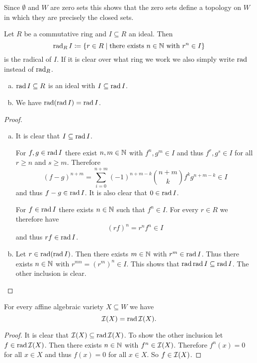 \begin{rem}
 Since $\emptyset$ and $W$ are zero sets this shows that the zero sets define a topology on $W$ in which they are precisely the closed sets.
\end{rem}


\begin{defi}
 Let $R$ be a commutative ring and $I \subseteq R$ an ideal. Then
 \[
  \operatorname{rad}_R I \coloneqq \{r \in R \mid \text{there exists } n \in \mathbb{N} \text{ with } r^n \in I\}
 \]
 is the radical of $I$. If it is clear over what ring we work we also simply write $\operatorname{rad}$ instead of $\operatorname{rad}_R$.
\end{defi}


\begin{lem}
 \begin{enumerate}[a)]
  Let $R$ be a commutative ring and $I \subseteq R$ an ideal. 
  \item
  $\operatorname{rad} I  \subseteq R$ is an ideal with $I \subseteq \operatorname{rad} I$.
  \item
  We have $\operatorname{rad}(\operatorname{rad} I) = \operatorname{rad} I$.
 \end{enumerate}
\end{lem}
\begin{proof}
 \begin{enumerate}[a)]
  \item
  It is clear that $I \subseteq \operatorname{rad} I$.
  
  For $f,g \in \operatorname{rad} I$ there exist $n,m \in \mathbb{N}$ with $f^n, g^m \in I$ and thus $f^r, g^s \in I$ for all $r \geq n$ and $s \geq m$. Therefore
  \[
   (f-g)^{n+m} = \sum_{i=0}^{n+m} (-1)^{n+m-k} \binom{n+m}{k} f^k g^{n+m-k} \in I
  \]
  and thus $f-g \in \operatorname{rad} I$. It is also clear that $0 \in \operatorname{rad} I$.
  
  For $f \in \operatorname{rad} I$ there exists $n \in \mathbb{N}$ such that $f^n \in I$. For every $r \in R$ we therefore have
  \[
   (rf)^n = r^n f^n \in I
  \]
  and thus $rf \in \operatorname{rad} I$.
  
  \item
  Let $r \in \operatorname{rad}(\operatorname{rad} I)$. Then there exists $m \in \mathbb{N}$ with $r^m \in \operatorname{rad} I$. Thus there exists $n \in \mathbb{N}$ with $r^{mn} = (r^m)^n \in I$. This shows that $\operatorname{rad} \operatorname{rad} I \subseteq \operatorname{rad} I$. The other inclusion is clear.
 \end{enumerate}
\end{proof}


\begin{lem}
 For every affine algebraic variety $X \subseteq W$ we have
 \[
 \mathcal{I}(X) = \operatorname{rad} \mathcal{I}(X).
 \]
\end{lem}
\begin{proof}
 It is clear that $\mathcal{I}(X) \subseteq \operatorname{rad} \mathcal{I}(X)$. To show the other inclusion let \mbox{$f \in \operatorname{rad} \mathcal{I}(X)$}. Then there exists $n \in \mathbb{N}$ with $f^n \in \mathcal{I}(X)$. Therefore $f^n(x) = 0$ for all $x \in X$ and thus $f(x) = 0$ for all $x \in X$. So $f \in \mathcal{I}(X)$.
\end{proof}


